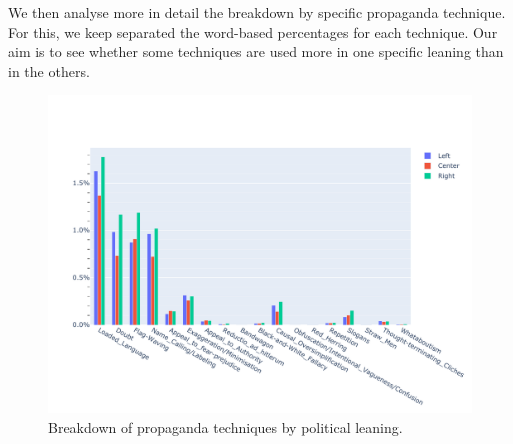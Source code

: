



We then analyse more in detail the breakdown by specific propaganda technique. For this, we keep separated the word-based percentages for each technique.
Our aim is to see whether some techniques are used more in one specific leaning than in the others.


\begin{figure}[!htbp]
    \centering
    \includegraphics[trim={0 0 0 2cm},clip,width=\linewidth]{figures/prop_tech_detail_across_leaning_baly.pdf}
    \caption{Breakdown of propaganda techniques by political leaning.}
    \label{fig:prop_tech_details_across_leaning}
\end{figure}


